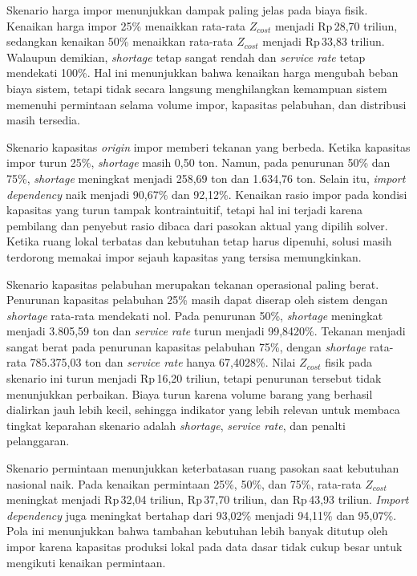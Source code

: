 \documentclass[journal]{IEEEtran}
\theoremstyle{definition}
\theoremstyle{definition}
\theoremstyle{plain}
\begin{document}
    Skenario harga impor menunjukkan dampak paling jelas pada biaya fisik. Kenaikan harga impor 25\% menaikkan rata-rata $Z_{cost}$ menjadi Rp\,28,70 triliun, sedangkan kenaikan 50\% menaikkan rata-rata $Z_{cost}$ menjadi Rp\,33,83 triliun. Walaupun demikian, \textit{shortage} tetap sangat rendah dan \textit{service rate} tetap mendekati 100\%. Hal ini menunjukkan bahwa kenaikan harga mengubah beban biaya sistem, tetapi tidak secara langsung menghilangkan kemampuan sistem memenuhi permintaan selama volume impor, kapasitas pelabuhan, dan distribusi masih tersedia.

    Skenario kapasitas \textit{origin} impor memberi tekanan yang berbeda. Ketika kapasitas impor turun 25\%, \textit{shortage} masih 0,50 ton. Namun, pada penurunan 50\% dan 75\%, \textit{shortage} meningkat menjadi 258,69 ton dan 1.634,76 ton. Selain itu, \textit{import dependency} naik menjadi 90,67\% dan 92,12\%. Kenaikan rasio impor pada kondisi kapasitas yang turun tampak kontraintuitif, tetapi hal ini terjadi karena pembilang dan penyebut rasio dibaca dari pasokan aktual yang dipilih solver. Ketika ruang lokal terbatas dan kebutuhan tetap harus dipenuhi, solusi masih terdorong memakai impor sejauh kapasitas yang tersisa memungkinkan.

    Skenario kapasitas pelabuhan merupakan tekanan operasional paling berat. Penurunan kapasitas pelabuhan 25\% masih dapat diserap oleh sistem dengan \textit{shortage} rata-rata mendekati nol. Pada penurunan 50\%, \textit{shortage} meningkat menjadi 3.805,59 ton dan \textit{service rate} turun menjadi 99,8420\%. Tekanan menjadi sangat berat pada penurunan kapasitas pelabuhan 75\%, dengan \textit{shortage} rata-rata 785.375,03 ton dan \textit{service rate} hanya 67,4028\%. Nilai $Z_{cost}$ fisik pada skenario ini turun menjadi Rp\,16,20 triliun, tetapi penurunan tersebut tidak menunjukkan perbaikan. Biaya turun karena volume barang yang berhasil dialirkan jauh lebih kecil, sehingga indikator yang lebih relevan untuk membaca tingkat keparahan skenario adalah \textit{shortage}, \textit{service rate}, dan penalti pelanggaran.

    Skenario permintaan menunjukkan keterbatasan ruang pasokan saat kebutuhan nasional naik. Pada kenaikan permintaan 25\%, 50\%, dan 75\%, rata-rata $Z_{cost}$ meningkat menjadi Rp\,32,04 triliun, Rp\,37,70 triliun, dan Rp\,43,93 triliun. \textit{Import dependency} juga meningkat bertahap dari 93,02\% menjadi 94,11\% dan 95,07\%. Pola ini menunjukkan bahwa tambahan kebutuhan lebih banyak ditutup oleh impor karena kapasitas produksi lokal pada data dasar tidak cukup besar untuk mengikuti kenaikan permintaan.
\end{document}
